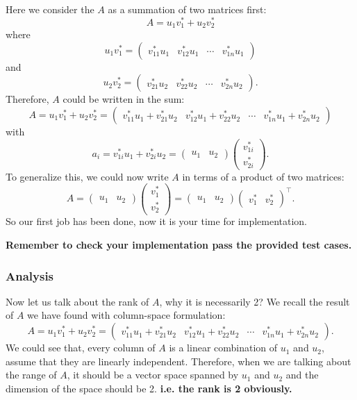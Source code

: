 \noindent Here we consider the $A$ as a summation of two matrices first:
\[
A = u_1v_1^{*} + u_2v_2^{*}
\]
where
\[
  u_1v_1^{*} = \begin{pmatrix} v_{11}^{*}u_1 & v_{12}^{*}u_1 & \cdots & v_{1n}^{*}u_1 \end{pmatrix} 
\]
and
\[
  u_2v_2^{*} = \begin{pmatrix} v_{21}^{*}u_2 & v_{22}^{*}u_2 & \cdots & v_{2n}^{*}u_2 \end{pmatrix} 
.\] 
Therefore, $A$ could be written in the sum:
\[
  A = u_1v_1^{*} + u_2v_2^{*} = \begin{pmatrix} v_{11}^{*}u_1 + v_{21}^{*}u_2 & v_{12}^{*}u_1 + v_{22}^{*}u_2 & \cdots & v_{1n}^{*}u_1 + v_{2n}^{*}u_2 \end{pmatrix} 
\]
with
\[
  a_{i} = v_{1i}^{*}u_1 + v_{2i}^{*}u_2 = \begin{pmatrix} u_1 & u_2 \end{pmatrix} \begin{pmatrix} v_{1i}^{*}\\ v_{2i}^{*} \end{pmatrix}
.\] 
To generalize this, we could now write $A$ in terms of a product of two matrices:
\[
A = \begin{pmatrix} u_1 & u_2 \end{pmatrix} \begin{pmatrix} v_{1}^{*}\\ v_{2}^{*} \end{pmatrix}   = \begin{pmatrix} u_1 & u_2 \end{pmatrix} \begin{pmatrix} v_{1}^{*} & v_{2}^{*} \end{pmatrix}^{\top}
.\]
So our first job has been done, now it is your time for implementation. \medskip

\noindent 
\textbf{Remember to check your implementation pass the provided test cases.}
% 
\subsubsection*{Analysis}
Now let us talk about the rank of $A$, why it is necessarily 2?
We recall the result of $A$ we have found with column-space formulation: 
\[
A = u_1v_1^{*} + u_2v_2^{*} = \begin{pmatrix} v_{11}^{*}u_1 + v_{21}^{*}u_2 & v_{12}^{*}u_1 + v_{22}^{*}u_2 & \cdots & v_{1n}^{*}u_1 + v_{2n}^{*}u_2 \end{pmatrix} 
.\]
We could see that, every column of $A$ is a linear combination of $u_1$ and $u_2$, assume that they are linearly independent. Therefore, when we are talking about the range of $A$, it should be a vector space spanned by $u_1$ and $u_2$ and the dimension of the space should be 2. \textbf{i.e. the rank is 2 obviously.} 
\newpage
